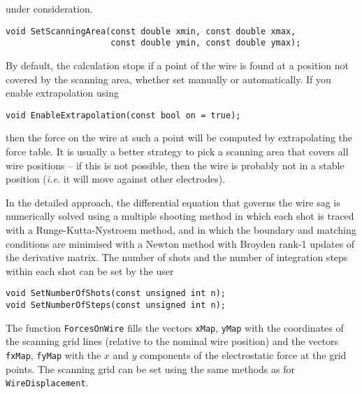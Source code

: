 \begin{itemize}
under consideration.
\begin{lstlisting}
void SetScanningArea(const double xmin, const double xmax, 
                     const double ymin, const double ymax);
\end{lstlisting}
By default, the calculation stops if a point of the wire is found at a 
position not covered by the scanning area, whether set manually or 
automatically.
If you enable extrapolation using
\begin{lstlisting}
void EnableExtrapolation(const bool on = true);
\end{lstlisting}
then the force on the wire at such a point will be computed by 
extrapolating the force table.
It is usually a better strategy to pick a scanning area that covers all 
wire positions -- if this is not possible, then the wire is probably not 
in a stable position (\textit{i.e.} it will move against other electrodes).
\end{itemize}
In the detailed approach, the differential equation that governs the wire 
sag is numerically solved using a multiple shooting method in which each 
shot is traced with a Runge-Kutta-Nystroem method, and in which the 
boundary and matching conditions are minimised with a Newton method with 
Broyden rank-1 updates of the derivative matrix.
The number of shots and the number of integration steps within each shot 
can be set by the user
\begin{lstlisting}
void SetNumberOfShots(const unsigned int n);
void SetNumberOfSteps(const unsigned int n);
\end{lstlisting}

The function \texttt{ForcesOnWire} fills the vectors \texttt{xMap}, 
\texttt{yMap} with the coordinates of the scanning grid lines 
(relative to the nominal wire position) and the vectors \texttt{fxMap},  
\texttt{fyMap} with the $x$ and $y$ components of the electrostatic 
force at the grid points. 
The scanning grid can be set using the same methods as 
for \texttt{WireDisplacement}. 

